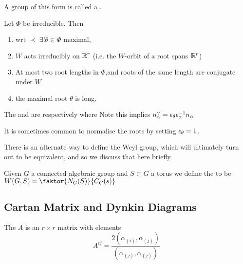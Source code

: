 \documentclass{article}
\begin{document}
\begin{remark}
	A group of this form is called a .
\end{remark}

\begin{prop}
	Let $\Phi$ be irreducible. Then
	\begin{enumerate}
		\item wrt $\prec$ $\exists! \theta \in \Phi$ maximal,
		\item $W$ acts irreducibly on $\mathbb{R}^r$ (i.e. the $W$-orbit of a root spans $\mathbb{R}^r$)
		\item At most two root lengths in $\Phi$,and roots of the same length are conjugate under $W$
		\item the maximal root $\theta$ is long. 
	\end{enumerate}
\end{prop}

\begin{definition}
	The  and  are respectively 
where 
Note this implies $n_\alpha^\vee = \epsilon_\theta \epsilon_\alpha^{-1} n_\alpha$
\end{definition}

\begin{remark}
	It is sometimes common to normalise the roots by setting $\epsilon_\theta = 1$. 
\end{remark}

There is an alternate way to define the Weyl group, which will ultimately turn out to be equivalent, and so we discuss that here briefly. 

\begin{definition}
	Given $G$ a  connected algebraic group and $S \subset G$ a torus we define the  to be $W(G,S) = \faktor{N_G(S)}{C_G(s)}$
\end{definition}
\subsection{Cartan Matrix and Dynkin Diagrams}

\begin{definition}
	The  $A$ is an $r \times r$ matrix with elements 
	\[
	A^{ij}=\frac{2(\alpha_{(i)},\alpha_{(j)})}{(\alpha_{(j)},\alpha_{(j)})}
	\]
\end{definition}
\end{document}
